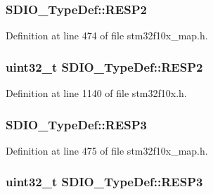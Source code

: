 \subsubsection[{\texorpdfstring{R\+E\+S\+P2}{RESP2}}]{ S\+D\+I\+O\+\_\+\+Type\+Def\+::\+R\+E\+S\+P2}\hypertarget{struct_s_d_i_o___type_def_a3f6725c3b05aec55920a6f9082044ff0}{}\label{struct_s_d_i_o___type_def_a3f6725c3b05aec55920a6f9082044ff0}


Definition at line 474 of file stm32f10x\+\_\+map.\+h.

\subsubsection[{\texorpdfstring{R\+E\+S\+P2}{RESP2}}]{ {\bf uint32\+\_\+t} S\+D\+I\+O\+\_\+\+Type\+Def\+::\+R\+E\+S\+P2}\hypertarget{struct_s_d_i_o___type_def_a9228c8a38c07c508373644220dd322f0}{}\label{struct_s_d_i_o___type_def_a9228c8a38c07c508373644220dd322f0}


Definition at line 1140 of file stm32f10x.\+h.

\subsubsection[{\texorpdfstring{R\+E\+S\+P3}{RESP3}}]{ S\+D\+I\+O\+\_\+\+Type\+Def\+::\+R\+E\+S\+P3}\hypertarget{struct_s_d_i_o___type_def_a7d035d0dd59d2355af287a7b8b8f4d21}{}\label{struct_s_d_i_o___type_def_a7d035d0dd59d2355af287a7b8b8f4d21}


Definition at line 475 of file stm32f10x\+\_\+map.\+h.

\subsubsection[{\texorpdfstring{R\+E\+S\+P3}{RESP3}}]{ {\bf uint32\+\_\+t} S\+D\+I\+O\+\_\+\+Type\+Def\+::\+R\+E\+S\+P3}\hypertarget{struct_s_d_i_o___type_def_a70f3e911570bd326bff852664fd8a7d5}{}\label{struct_s_d_i_o___type_def_a70f3e911570bd326bff852664fd8a7d5}


